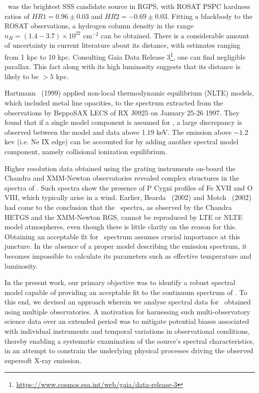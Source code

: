 		\source\ was the brightest SSS candidate source in RGPS, with ROSAT PSPC hardness ratios of $HR1=0.96\pm 0.03$ and $HR2=-0.69\pm 0.03$. Fitting a blackbody to the ROSAT observations, a hydrogen column density in the range $n_H=(1.4-3.7)\times 10^{22}$ cm$^{-2}$ can be obtained. There is a considerable amount of uncertainty in current literature about its distance, with estimates ranging from 1 kpc to 10 kpc. Consulting Gaia Data Release 3\footnote{\url{https://www.cosmos.esa.int/web/gaia/data-release-3}}, one can find negligible parallax. This fact along with its high luminosity suggests that its distance is likely to be $>5$ kpc.
		
		Hartmann \etal\ (1999) \cite{hartmann1999constraining} applied non-local thermodynamic equilibrium (NLTE) models, which included metal line opacities, to the spectrum extracted from the observations by BeppoSAX LECS of RX J0925 on January 25-26 1997. They found that if a single model component is assumed for \source, a large discrepancy is observed between the model and data above 1.19 keV. The emission above $\sim 1.2$ kev (i.e. Ne IX edge) can be accounted for by adding another spectral model component, namely collisional ionization equilibrium.
		
		Higher resolution data obtained using the grating instruments on-board the Chandra and XMM-Newton observatories revealed complex structures in the spectra of \source. Such spectra show the presence of P Cygni profiles of Fe XVII and O VIII, which typically arise in a wind. Earlier, Bearda \etal\ (2002) \cite{beardaChandra2002AA} and Motch \etal\ (2002) \cite{motchXmmNewton2002AA} had come to the conclusion that the \source\ spectra, as observed by the Chandra HETGS and the XMM-Newton RGS, cannot be reproduced by LTE or NLTE model atmospheres, even though there is little clarity on the reason for this. Obtaining an acceptable fit for \source\ spectrum assumes crucial importance at this juncture. In the absence of a proper model describing the emission spectrum, it becomes impossible to calculate its parameters such as effective temperature and luminosity.
		
		In the present work, our primary objective was to identify a robust spectral model capable of providing an acceptable fit to the continuum spectrum of \source. To this end, we devised an approach wherein we analyse spectral data for \source\ obtained using multiple observatories. A motivation for harnessing such multi-observatory science data over an extended period was to mitigate potential biases associated with individual instruments and temporal variations in observational conditions, thereby enabling a systematic examination of the source's spectral characteristics, in an attempt to constrain the underlying physical processes driving the observed supersoft X-ray emission.
		
